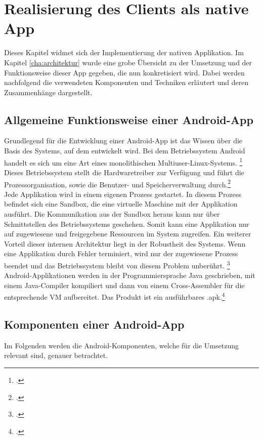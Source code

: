 \chapter{Realisierung des Clients als native App}
\label{cha:native-app}
Dieses Kapitel widmet sich der Implementierung der nativen Applikation. Im Kapitel \ref{cha:architektur} wurde eine grobe Übersicht zu der Umsetzung und der Funktionsweise dieser \gls{App} gegeben, die nun konkretisiert wird.
Dabei werden nachfolgend die verwendeten Komponenten und Techniken erläutert und deren Zusammenhänge dargestellt.
\section{Allgemeine Funktionsweise einer Android-App}
\label{sec:definition-android}
Grundlegend für die Entwicklung einer \gls{Android}-\gls{App} ist das Wissen über die Basis des Systems, auf dem entwickelt wird. 
Bei dem Betriebssystem \gls{Android} handelt es sich um eine Art eines \gls{monolithisch}en Multiuser-\gls{Linux}-Systems. \footcite{Android-Fundamentals}
Dieses Betriebssystem stellt die Hardwaretreiber zur Verfügung und führt die Prozessorganisation, sowie die Benutzer- und Speicherverwaltung durch.\footcite[S. 19ff.]{Android-BeckerPant} \\
Jede Applikation wird in einem eigenen Prozess gestartet. In diesem Prozess befindet sich eine \gls{Sandbox}, die eine virtuelle Maschine mit der Applikation ausführt. Die Kommunikation aus der \gls{Sandbox} heraus kann nur über Schnittstellen des Betriebssystems geschehen. Somit kann eine Applikation nur auf zugewiesene und freigegebene Ressourcen im System zugreifen. Ein weiterer Vorteil dieser internen Architektur liegt in der Robustheit des Systems. Wenn eine Applikation durch Fehler terminiert, wird nur der zugewiesene Prozess beendet und das Betriebssystem bleibt von diesem Problem unberührt. \footcite{Android-SystemPermissions} \\
\gls{Android}-Applikationen werden in der Programmiersprache \gls{Java} geschrieben, mit einem Java-Compiler kompiliert und dann von einem Cross-Assembler für die entsprechende \ac{VM} aufbereitet. Das Produkt ist ein ausführbares \ac{.apk}.\footcite{Android-Fundamentals}
\section{Komponenten einer Android-App}
\label{sec:kompoenten-android}
Im Folgenden werden die \gls{Android}-Komponenten, welche für die Umsetzung relevant sind, genauer betrachtet.
